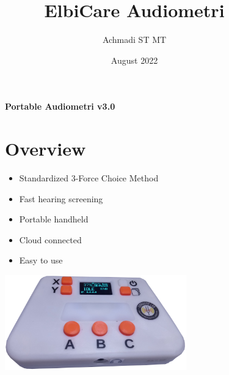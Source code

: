 \documentclass[a4paper,12pt,oneside,pdflatex,italian,final,twocolumn]{article}
\title{ElbiCare Audiometri}
\author{Achmadi ST MT}
\date{August 2022}
\begin{document}
\pagestyle{fancy}

\chead {\today}


\onecolumn

\begin{figure}
\begin{minipage}{0.47\textwidth}
\centering

\end{minipage}
\hfill
\begin{minipage}{0.47\textwidth}
\raggedleft
\Huge \textbf{Portable Audiometri v3.0}
\end{minipage}
\end{figure}


\begin{figure}
\begin{minipage}{0.47\textwidth}

\section{Overview}
    \begin{itemize}
        \item Standardized 3-Force Choice Method
        \item Fast hearing screening
        \item Portable handheld
        \item Cloud connected
        \item Easy to use
    \end{itemize}


\end{minipage}
\hfill
\begin{minipage}{0.47\textwidth}
\centering
\includegraphics[width=0.7\textwidth,right]{images/audiometri.png}

\end{minipage}
\end{figure}
\end{document}
